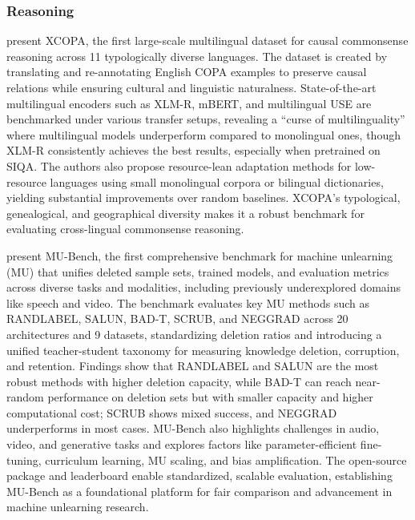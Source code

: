 \documentclass[acmsmall]{acmart}
\begin{document}
\subsubsection{Reasoning}
\noindent

\citep{ponti-etal-2020-xcopa} present XCOPA, the first large-scale multilingual dataset for causal commonsense reasoning across 11 typologically diverse languages. The dataset is created by translating and re-annotating English COPA examples to preserve causal relations while ensuring cultural and linguistic naturalness. State-of-the-art multilingual encoders such as XLM-R, mBERT, and multilingual USE are benchmarked under various transfer setups, revealing a “curse of multilinguality” where multilingual models underperform compared to monolingual ones, though XLM-R consistently achieves the best results, especially when pretrained on SIQA. The authors also propose resource-lean adaptation methods for low-resource languages using small monolingual corpora or bilingual dictionaries, yielding substantial improvements over random baselines. XCOPA’s typological, genealogical, and geographical diversity makes it a robust benchmark for evaluating cross-lingual commonsense reasoning.

\citep{cheng2024mubenchmultitaskmultimodalbenchmark} present MU-Bench, the first comprehensive benchmark for machine unlearning (MU) that unifies deleted sample sets, trained models, and evaluation metrics across diverse tasks and modalities, including previously underexplored domains like speech and video. The benchmark evaluates key MU methods such as RANDLABEL, SALUN, BAD-T, SCRUB, and NEGGRAD across 20 architectures and 9 datasets, standardizing deletion ratios and introducing a unified teacher-student taxonomy for measuring knowledge deletion, corruption, and retention. Findings show that RANDLABEL and SALUN are the most robust methods with higher deletion capacity, while BAD-T can reach near-random performance on deletion sets but with smaller capacity and higher computational cost; SCRUB shows mixed success, and NEGGRAD underperforms in most cases. MU-Bench also highlights challenges in audio, video, and generative tasks and explores factors like parameter-efficient fine-tuning, curriculum learning, MU scaling, and bias amplification. The open-source package and leaderboard enable standardized, scalable evaluation, establishing MU-Bench as a foundational platform for fair comparison and advancement in machine unlearning research.
\end{document}
